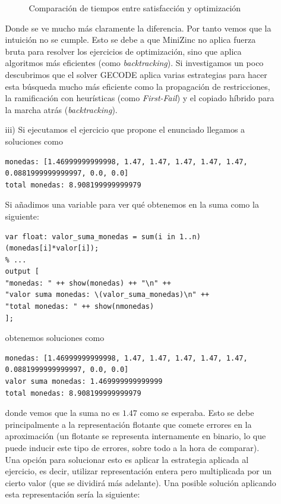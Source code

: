 \documentclass[11pt]{article}
\begin{document}
\begin{enumerate}[label=\alph*)]
\begin{enumerate}
\begin{figure}[H]
            \caption{Comparación de tiempos entre satisfacción y optimización}
            \label{fig:eficiencia_1a_vs_1b}
        \end{figure}

        Donde se ve mucho más claramente la diferencia. Por tanto vemos que la intuición no se cumple. Esto se debe a que MiniZinc no aplica fuerza bruta para resolver los ejercicios de optimización, sino que aplica algoritmos más eficientes (como \textit{backtracking}). Si investigamos un poco descubrimos que el solver GECODE aplica varias estrategias para hacer esta búsqueda mucho más eficiente como la propagación de restricciones, la ramificación con heurísticas (como \textit{First-Fail}) y el copiado híbrido para la marcha atrás (\textit{backtracking}).

        \item[iii)] Si ejecutamos el ejercicio que propone el enunciado llegamos a soluciones como 
\begin{lstlisting}[language=MiniZinc]
monedas: [1.46999999999998, 1.47, 1.47, 1.47, 1.47, 1.47, 0.0881999999999997, 0.0, 0.0]
total monedas: 8.908199999999979
\end{lstlisting}
        Si añadimos una variable para ver qué obtenemos en la suma como la siguiente:
\begin{lstlisting}[language=MiniZinc]
var float: valor_suma_monedas = sum(i in 1..n)(monedas[i]*valor[i]);
% ...
output [
"monedas: " ++ show(monedas) ++ "\n" ++
"valor suma monedas: \(valor_suma_monedas)\n" ++
"total monedas: " ++ show(nmonedas)
];
\end{lstlisting}
        obtenemos soluciones como
\begin{lstlisting}[basicstyle=\ttfamily\fontsize{7}{9}\selectfont]
monedas: [1.46999999999998, 1.47, 1.47, 1.47, 1.47, 1.47, 0.0881999999999997, 0.0, 0.0]
valor suma monedas: 1.469999999999999
total monedas: 8.908199999999979
\end{lstlisting}
        donde vemos que la suma no es $1.47$ como se esperaba. Esto se debe principalmente a la representación flotante que comete errores en la aproximación (un flotante se representa internamente en binario, lo que puede inducir este tipo de errores, sobre todo a la hora de comparar).\\
        Una opción para solucionar esto es aplicar la estrategia aplicada al ejercicio, es decir, utilizar representación entera pero multiplicada por un cierto valor (que se dividirá más adelante). Una posible solución aplicando esta representación sería la siguiente:


\end{enumerate}
\end{enumerate}
\end{document}
